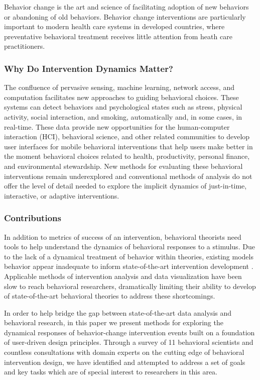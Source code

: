 \documentclass[review,journal]{vgtc}         %
\begin{document}
Behavior change is the art and science of facilitating adoption of new behaviors or abandoning of old behaviors.
Behavior change interventions are particularly important to modern health care systems in developed countries, where preventative behavioral treatment receives little attention from heath care practitioners.


\subsubsection{Why Do Intervention Dynamics Matter?}
The confluence of pervasive sensing, machine learning, network access, and computation facilitates new approaches to guiding behavioral choices. 
These systems can detect behaviors and psychological states such as stress\cite{chang2011,lu2012}, physical activity\cite{li2010,emken2012}, social interaction\cite{wyatt2011}, and smoking\cite{sazonov2011}, automatically and, in some cases, in real-time.
These data provide new opportunities for the human-computer interaction (HCI), behavioral science, and other related communities to develop user interfaces for mobile behavioral interventions that help users make better in the moment behavioral choices related to health\cite{klasnja2012,nahum2012}, productivity\cite{ho2005,sohn2005,jewell2011}, personal finance\cite{gallego2012}, and environmental stewardship.\cite{elliott2012}
New methods for evaluating these behavioral interventions remain underexplored and conventional methods of analysis do not offer the level of detail needed to explore the implicit dynamics of just-in-time, interactive, or adaptive interventions.

\subsubsection{Contributions}
In addition to metrics of success of an intervention, behavioral theorists need tools to help understand the dynamics of behavioral responses to a stimulus.
Due to the lack of a dynamical treatment of behavior within theories, existing models behavior appear inadequate to inform state-of-the-art intervention development \cite{riley2011}.
Applicable methods of intervention analysis \cite{???} and data visualization have been slow to reach behavioral researchers, dramatically limiting their ability to develop of state-of-the-art behavioral theories to address these shortcomings.

In order to help bridge the gap between state-of-the-art data analysis and behavioral research, in this paper we present methods for exploring the dynamical responses of behavior-change intervention events built on a foundation of user-driven design principles.
Through a survey of 11 behavioral scientists and countless consultations with domain experts on the cutting edge of behavioral intervention design, we have identified and attempted to address a set of goals and key tasks which are of special interest to researchers in this area. 
\end{document}
